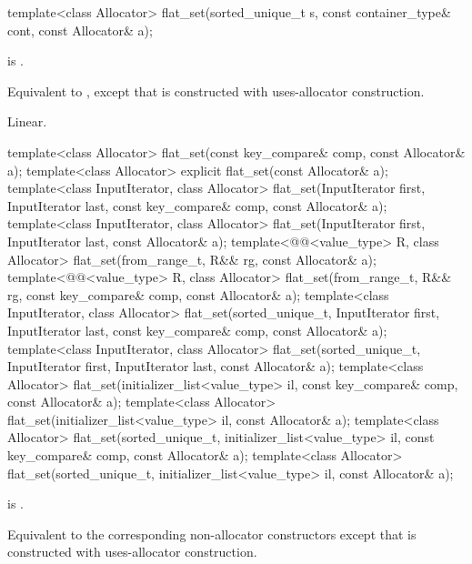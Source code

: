 %
\begin{itemdecl}
template<class Allocator>
  flat_set(sorted_unique_t s, const container_type& cont, const Allocator& a);
\end{itemdecl}

\begin{itemdescr}
\pnum
\constraints
{} is .

\pnum
\effects
Equivalent to ,
except that  is constructed with
uses-allocator construction.

\pnum
\complexity
Linear.
\end{itemdescr}

%
\begin{itemdecl}
template<class Allocator>
  flat_set(const key_compare& comp, const Allocator& a);
template<class Allocator>
  explicit flat_set(const Allocator& a);
template<class InputIterator, class Allocator>
  flat_set(InputIterator first, InputIterator last, const key_compare& comp, const Allocator& a);
template<class InputIterator, class Allocator>
  flat_set(InputIterator first, InputIterator last, const Allocator& a);
template<@@<value_type> R, class Allocator>
  flat_set(from_range_t, R&& rg, const Allocator& a);
template<@@<value_type> R, class Allocator>
  flat_set(from_range_t, R&& rg, const key_compare& comp, const Allocator& a);
template<class InputIterator, class Allocator>
  flat_set(sorted_unique_t, InputIterator first, InputIterator last,
           const key_compare& comp, const Allocator& a);
template<class InputIterator, class Allocator>
  flat_set(sorted_unique_t, InputIterator first, InputIterator last, const Allocator& a);
template<class Allocator>
  flat_set(initializer_list<value_type> il, const key_compare& comp, const Allocator& a);
template<class Allocator>
  flat_set(initializer_list<value_type> il, const Allocator& a);
template<class Allocator>
  flat_set(sorted_unique_t, initializer_list<value_type> il,
           const key_compare& comp, const Allocator& a);
template<class Allocator>
  flat_set(sorted_unique_t, initializer_list<value_type> il, const Allocator& a);
\end{itemdecl}

\begin{itemdescr}
\pnum
\constraints
{} is .

\pnum
\effects
Equivalent to the corresponding non-allocator constructors
except that  is constructed with
uses-allocator construction.
\end{itemdescr}

